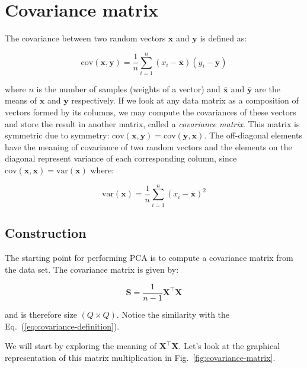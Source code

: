 \documentclass[10pt,twocolumn]{article}
\begin{document}
\section{Covariance matrix}

The covariance between two random vectors $\mathbf{x}$ and $\mathbf{y}$ is defined as:

\begin{equation}\label{eq:covariance-definition}
\text{cov}(\mathbf{x},\mathbf{y}) = \frac{1}{n} \sum_{i=1}^{n} (x_i - \bar{\mathbf{x}}) (y_i - \bar{\mathbf{y}})
\end{equation}

where $n$ is the number of samples (weights of a vector) and $\bar{\mathbf{x}}$ and $\bar{\mathbf{y}}$ are the means of $\mathbf{x}$ and $\mathbf{y}$ respectively. If we look at any data matrix as a composition of vectors formed by its columns, we may compute the covariances of these vectors and store the result in another matrix, called a \textit{covariance matrix}. This matrix is symmetric due to symmetry: $\text{cov}(\mathbf{x},\mathbf{y}) = \text{cov}(\mathbf{y},\mathbf{x})$. The off-diagonal elements have the meaning of covariance of two random vectors and the elements on the diagonal represent variance of each corresponding column, since $\text{cov}(\mathbf{x},\mathbf{x}) = \text{var}(\mathbf{x})$ where:

\begin{equation}\label{eq:variance-definition}
\text{var}(\mathbf{x}) = \frac{1}{n} \sum_{i=1}^{n} (x_i - \bar{\mathbf{x}})^2
\end{equation}

\subsection{Construction}

The starting point for performing PCA is to compute a covariance matrix from the data set. The covariance matrix is given by:

\begin{equation}\label{eq:cov-matrix}
\mathbf{S} = \frac{1}{n-1} \mathbf{X}^{\top} \mathbf{X}
\end{equation}

and is therefore size $(Q \times Q)$. Notice the similarity with the Eq.~(\ref{eq:covariance-definition}).

We will start by exploring the meaning of $\mathbf{X}^{\top} \mathbf{X}$. Let's look at the graphical representation of this matrix multiplication in Fig.~\ref{fig:covariance-matrix}.
\end{document}
